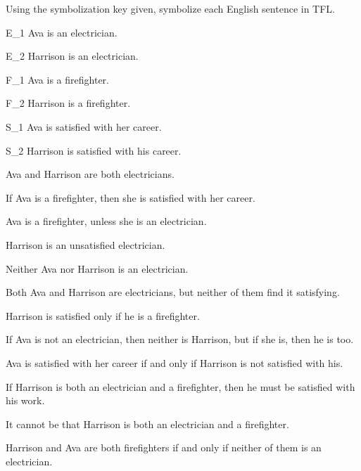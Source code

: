 \begin{practiceproblems}
\problempart Using the symbolization key given, symbolize each English sentence in TFL.\label{pr.avacareer}
	\begin{ekey}
		\item[E_1] Ava is an electrician.
		\item[E_2] Harrison is an electrician.
		\item[F_1] Ava is a firefighter.
		\item[F_2] Harrison is a firefighter.
		\item[S_1] Ava is satisfied with her career.
		\item[S_2] Harrison is satisfied with his career.
	\end{ekey}
\begin{earg}
\item Ava and Harrison are both electricians.
\item If Ava is a firefighter, then she is satisfied with her career.
\item Ava is a firefighter, unless she is an electrician.
\item Harrison is an unsatisfied electrician.
\item Neither Ava nor Harrison is an electrician.
\item Both Ava and Harrison are electricians, but neither of them find it satisfying.
\item Harrison is satisfied only if he is a firefighter.
\item If Ava is not an electrician, then neither is Harrison, but if she is, then he is too.
\item Ava is satisfied with her career if and only if Harrison is not satisfied with his.
\item If Harrison is both an electrician and a firefighter, then he must be satisfied with his work.
\item It cannot be that Harrison is both an electrician and a firefighter.
\item Harrison and Ava are both firefighters if and only if neither of them is an electrician.
\end{earg}



\end{practiceproblems}
